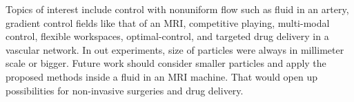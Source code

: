   Topics of interest include control with nonuniform flow such as fluid in an artery, gradient control fields like that of an MRI, competitive playing, multi-modal control, flexible workspaces, optimal-control, and targeted drug delivery in a vascular network. 
  In out experiments, size of particles were always in millimeter scale or bigger. Future work should consider smaller particles and apply the proposed methods inside a fluid in an MRI machine. That would open up possibilities for non-invasive surgeries and drug delivery.
 
